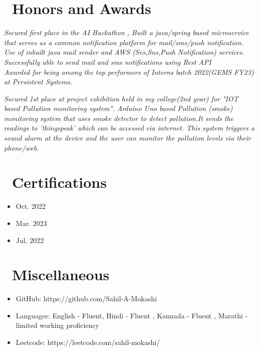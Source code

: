 \documentclass{resume}
\begin{document}
\section{\faHeartO\ Honors and Awards}
\textit{Secured first place in the AI Hackathon , Built a java/spring based microservice that serves as a common notification platform for mail/sms/push notification. Use of inbuilt java mail sender and AWS (Ses,Sns,Push Notification) services. Successfully able to send mail and sms notifications using Rest API \\ }
\textit{Awarded for being among the top performers of Interns batch
2022(GEMS FY23) at Persistent Systems.\\}

\textit{Secured 1st place at project exhibition held in my college(2nd year) for "IOT based Pollution monitoring system". Arduino Uno based Pollution
(smoke) monitoring system that uses smoke detector to detect
pollution.It sends the readings to 'thingspeak' which can be accessed via
internet. This system triggers a sound alarm at the device and the user can monitor the pollution levels via their phone/web.}

\section{\faGraduationCap\ Certifications}
\begin{itemize}[parsep=0.5ex]
  \item {}
{Oct. 2022}
  \item {}
{Mar. 2023}
  \item {}
{Jul. 2022}
\end{itemize}



\section{\faInfo\ Miscellaneous}
\begin{itemize}[parsep=0.5ex]
  \item GitHub: https://github.com/Sahil-A-Mokashi
  \item Languages: English - Fluent, Hindi - Fluent , Kannada - Fluent , Marathi - limited working proficiency
  \item Leetcode: https://leetcode.com/sahil-mokashi/
\end{itemize}

%
%
\end{document}
